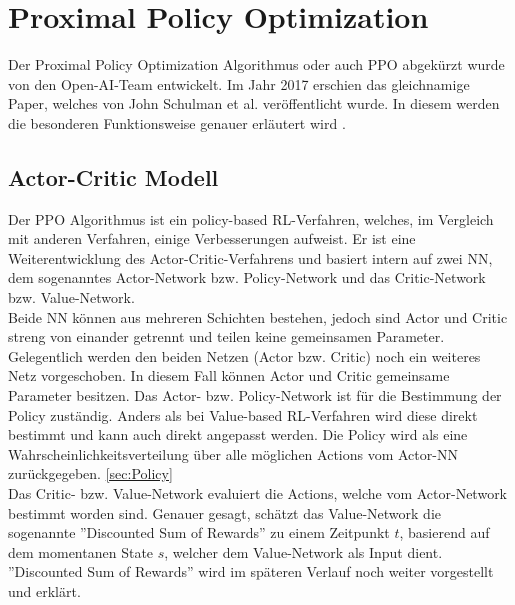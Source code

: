 \section{Proximal Policy Optimization}
Der Proximal Policy Optimization Algorithmus oder auch PPO abgekürzt wurde von den Open-AI-Team entwickelt. Im Jahr 2017 erschien das gleichnamige Paper, welches von John Schulman et al. veröffentlicht wurde. In diesem werden die besonderen Funktionsweise genauer erläutert wird \cite{PPO}.

\subsection{Actor-Critic Modell} \label{sec:actor_critic}
Der PPO Algorithmus ist ein policy-based RL-Verfahren, welches, im Vergleich mit anderen Verfahren, einige Verbesserungen aufweist. Er ist eine Weiterentwicklung des Actor-Critic-Verfahrens und basiert intern auf zwei NN, dem sogenanntes Actor-Network bzw. Policy-Network und das Critic-Network bzw. Value-Network. \cite[S. 273 f.]{Sutton1998}\\
Beide NN können aus mehreren Schichten bestehen, jedoch sind Actor und Critic streng von einander getrennt und teilen keine gemeinsamen Parameter. Gelegentlich werden den beiden Netzen (Actor bzw. Critic) noch ein weiteres Netz vorgeschoben. In diesem Fall können Actor und Critic gemeinsame Parameter besitzen.
Das Actor- bzw. Policy-Network ist für die Bestimmung der Policy zuständig. Anders als bei Value-based RL-Verfahren wird diese direkt bestimmt und kann auch direkt angepasst werden. Die Policy wird als eine Wahrscheinlichkeitsverteilung über alle möglichen Actions vom Actor-NN zurückgegeben. \ref{sec:Policy}\\
Das Critic- bzw. Value-Network evaluiert die Actions, welche vom Actor-Network bestimmt worden sind. Genauer gesagt, schätzt das Value-Network die sogenannte ''Discounted Sum of Rewards'' zu einem Zeitpunkt $t$, basierend auf dem momentanen State $s$, welcher dem Value-Network als Input dient. ''Discounted Sum of Rewards'' wird im späteren Verlauf noch weiter vorgestellt und erklärt.


